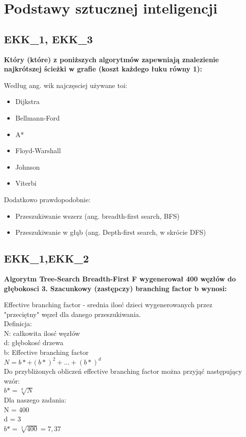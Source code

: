 \chapter{Podstawy sztucznej inteligencji}
\PartialToc
\section{EKK\_1, EKK\_3}
\textbf{Który (które) z poniższych algorytmów zapewniają znalezienie najkrótszej ścieżki w grafie (koszt każdego łuku równy 1):}
\vspace{0.4cm}

\noindent Według ang. wik najczęsciej używane toi:

\begin{itemize}
\item Dijkstra
\item Bellmann-Ford
\item A*
\item Floyd-Warshall
\item Johnson
\item Viterbi
\end{itemize}

Dodatkowo prawdopodobnie:
\begin{itemize}
\item Przeszukiwanie wszerz (ang. breadth-first search, BFS)
\item Przeszukiwanie w głąb (ang. Depth-first search, w skrócie DFS)
\end{itemize}

\section{EKK\_1,EKK\_2}
\textbf{Algorytm Tree-Search Breadth-First F wygenerował 400 węzłów do głębokosci 3.  Szacunkowy (zastępczy) branching factor b wynosi:}
\vspace{0.4cm}

\noindent Effective branching factor - srednia ilosć dzieci wygenerowanych przez "przeciętny" węzeł dla danego przeszukiwania.\\
Definicja:\\
N: całkowita ilosć węzłów\\
d: głębokosć drzewa\\
b: Effective branching factor\\
$N = b* + (b*)^2 + \ldots + (b*)^d$\\
Do przybliżonych obliczeń effective branching factor można przyjąć następujący wzór:\\
$b* = \sqrt[d]{N}$\\
Dla naszego zadania:\\
N = 400\\
d = 3\\
$b* = \sqrt[3]{400} = 7,37$

